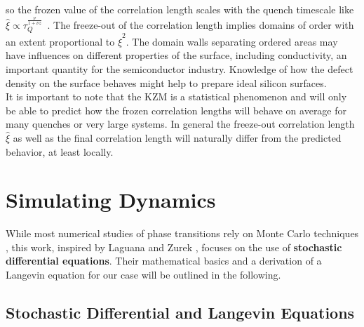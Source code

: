 	so the frozen value of the correlation length scales with the quench timescale like $\hat{\xi} \propto \tau_Q^{\frac{\nu}{1 + \nu z}}$~.
	The freeze-out of the correlation length implies domains of order with an extent proportional to $\hat{\xi}^2$. The domain walls separating ordered areas may have influences on different properties of the surface, including conductivity, an important quantity for the semiconductor industry. Knowledge of how the defect density on the surface behaves might help to prepare ideal silicon surfaces. \\
	
	It is important to note that the KZM is a statistical phenomenon and will only be able to predict how the frozen correlation lengths will behave on average for many quenches or very large systems. In general the freeze-out correlation length $\hat{\xi}$ as well as the final correlation length will naturally differ from the predicted behavior, at least locally.
	\chapter{Simulating Dynamics} \label{Chapter::Simulating-Dynamics}
	While most numerical studies of phase transitions rely on Monte Carlo techniques \cite{rastelli2004monte, ferrenberg1991critical, hasenbusch2005two}, this work, inspired by Laguana and Zurek \cite{laguna1997density}, focuses on the use of \textbf{stochastic differential equations}. Their mathematical basics and a derivation of a Langevin equation for our case  will be outlined in the following.
	\section{Stochastic Differential and Langevin Equations}
